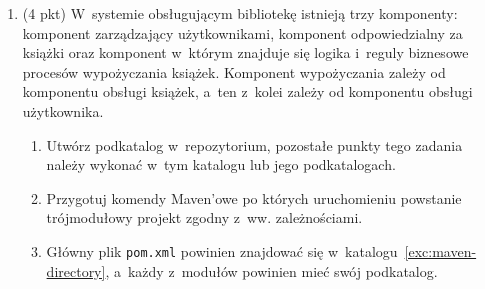 \documentclass[12pt]{article}
\begin{document}
\begin{enumerate}
        \item\label{exc:maven}
            (4 pkt) W~systemie obsługującym bibliotekę istnieją trzy komponenty: komponent zarządzający użytkownikami, komponent odpowiedzialny za książki oraz komponent w~którym znajduje się logika i~reguly biznesowe procesów wypożyczania książek. Komponent wypożyczania zależy od komponentu obsługi książek, a~ten z~kolei zależy od komponentu obsługi użytkownika.
            \begin{enumerate}
                \item\label{exc:maven-directory} Utwórz podkatalog w~repozytorium, pozostałe punkty tego zadania należy wykonać w~tym katalogu lub jego podkatalogach.
                \item Przygotuj komendy Maven’owe po których uruchomieniu powstanie trójmodułowy projekt zgodny z~ww. zależnościami.
                \item Główny plik \texttt{pom.xml} powinien znajdować się w~katalogu~\ref{exc:maven-directory}, a~każdy z~modułów powinien mieć swój podkatalog.
            \end{enumerate}

    \end{enumerate}
\end{document}
